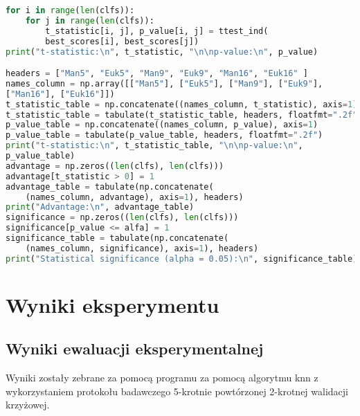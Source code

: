\documentclass[runningheads]{llncs}
\begin{document}
\begin{lstlisting}[language=Python]
for i in range(len(clfs)):
    for j in range(len(clfs)):
        t_statistic[i, j], p_value[i, j] = ttest_ind(
        best_scores[i], best_scores[j])
print("t-statistic:\n", t_statistic, "\n\np-value:\n", p_value)

headers = ["Man5", "Euk5", "Man9", "Euk9", "Man16", "Euk16" ]
names_column = np.array([["Man5"], ["Euk5"], ["Man9"], ["Euk9"],
["Man16"], ["Euk16"]])
t_statistic_table = np.concatenate((names_column, t_statistic), axis=1)
t_statistic_table = tabulate(t_statistic_table, headers, floatfmt=".2f")
p_value_table = np.concatenate((names_column, p_value), axis=1)
p_value_table = tabulate(p_value_table, headers, floatfmt=".2f")
print("t-statistic:\n", t_statistic_table, "\n\np-value:\n",
p_value_table)
advantage = np.zeros((len(clfs), len(clfs)))
advantage[t_statistic > 0] = 1
advantage_table = tabulate(np.concatenate(
    (names_column, advantage), axis=1), headers)
print("Advantage:\n", advantage_table)
significance = np.zeros((len(clfs), len(clfs)))
significance[p_value <= alfa] = 1
significance_table = tabulate(np.concatenate(
    (names_column, significance), axis=1), headers)
print("Statistical significance (alpha = 0.05):\n", significance_table)


\end{lstlisting}
\newpage
\section{Wyniki eksperymentu}
\subsection{Wyniki ewaluacji eksperymentalnej}
Wyniki zostały zebrane za pomocą programu za pomocą algorytmu knn z wykorzystaniem protokołu badawczego 5-krotnie powtórzonej 2-krotnej walidacji krzyżowej.
\end{document}
